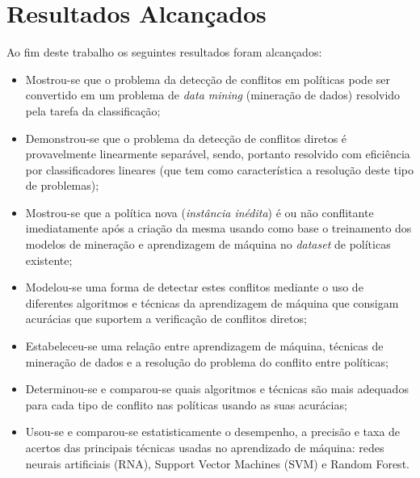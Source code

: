 \section*{Resultados Alcançados}\label{resultados_esperados}
Ao fim deste trabalho os seguintes resultados foram alcançados:
\begin{itemize}
	\item Mostrou-se que o problema da detecção de conflitos em políticas pode ser convertido em um problema de \textit{data mining} (mineração de dados) resolvido pela tarefa da classificação;
	\item Demonstrou-se que o problema da detecção de conflitos diretos é provavelmente linearmente separável, sendo, portanto resolvido com eficiência por classificadores lineares (que tem como característica a resolução deste tipo de problemas);
	\item Mostrou-se que a política nova (\textit{instância inédita})  é ou não conflitante imediatamente após a criação da mesma usando como base o treinamento dos modelos de mineração e aprendizagem de máquina no \textit{dataset} de políticas existente;
	\item Modelou-se uma forma de detectar estes conflitos mediante o uso de diferentes algoritmos e técnicas da aprendizagem de máquina que consigam acurácias que suportem a verificação de conflitos diretos;
	\item Estabeleceu-se uma relação entre aprendizagem de máquina, técnicas de mineração de dados e a resolução do problema do conflito entre políticas;
	\item Determinou-se e comparou-se quais algoritmos e técnicas são mais adequados para cada tipo de conflito nas políticas usando as suas acurácias;
	\item Usou-se e comparou-se estatisticamente o desempenho, a precisão e taxa de acertos das principais técnicas usadas no aprendizado de máquina: redes neurais artificiais (RNA), Support Vector Machines (SVM) e Random Forest.
	
\end{itemize} 

